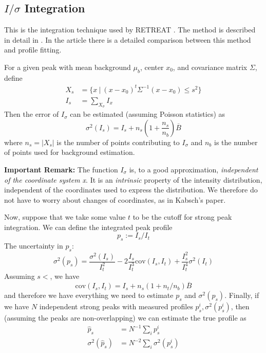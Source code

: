 \documentclass[twocolumn,preprintnumbers,amsmath,amssymb]{revtex4}
\newcommand{\cov}{\mathrm{cov}}
\begin{document}
\subsection{$I/\sigma$ Integration}
This is the integration technique used by RETREAT \cite{retreat-manual}. The method is described in detail in \cite{wilkinson-1988}.
In the article \cite{prince-1997} there is a detailed comparison between this method and profile fitting.

For a given peak with mean background $\mu_b$, center $x_0$, and covariance matrix $\Sigma$, define
\begin{align}
  X_s &= \{ x \ | \ (x-x_0)^t\Sigma^{-1}(x-x_0) \leq s^2\} \\
  I_s &= \sum_{X_\sigma} I_x
\end{align}
Then the error of $I_\sigma$ can be estimated (assuming Poisson statistics) as
\begin{equation}
  \sigma^2(I_s) = I_s + n_s(1+\frac{n_s}{n_b}) \overline{B}
\end{equation}
where $n_s = |X_s|$ is the number of points contributing to $I_\sigma$ and $n_b$ is the number of points used for background estimation.

\textbf{Important Remark:} The function $I_\sigma$ is, to a good approximation, \emph{independent of the coordinate system x}.
It is an \emph{intrinsic} property of the intensity distribution, independent of the coordinates used to express the distribution.
We therefore do not have to worry about changes of coordinates, as in Kabsch's paper.


Now, suppose that we take some value $t$ to be the cutoff for strong peak integration. We can define the integrated peak profile
\begin{equation}
  p_s := I_s / I_t
\end{equation}
The uncertainty in $p_s$:
\begin{equation}
  \sigma^2(p_s) = \frac{\sigma^2(I_s)}{I_t^2} - 2 \frac{I_s}{I_t^3} \cov(I_s, I_t) + \frac{I_s^2}{I_t^4} \sigma^2(I_t)
\end{equation}
Assuming $s < $, we have
\begin{equation}
  \cov(I_s, I_t) = I_s + n_s(1+n_t/n_b)\overline{B}
\end{equation}
and therefore we have everything we need to estimate $p_s$ and $\sigma^2(p_s)$. Finally, if we have $N$ independent strong
peaks with measured profiles $p^i_s, \sigma^2(p^i_s)$, then (assuming the peaks are non-overlapping) we can estimate the
true profile as
\begin{align}
  \hat{p}_s &= N^{-1} \sum_i p^i_s \\
 \sigma^2(\hat{p}_s) &= N^{-2} \sum_i \sigma^2(p^i_s)
\end{align}
\end{document}
